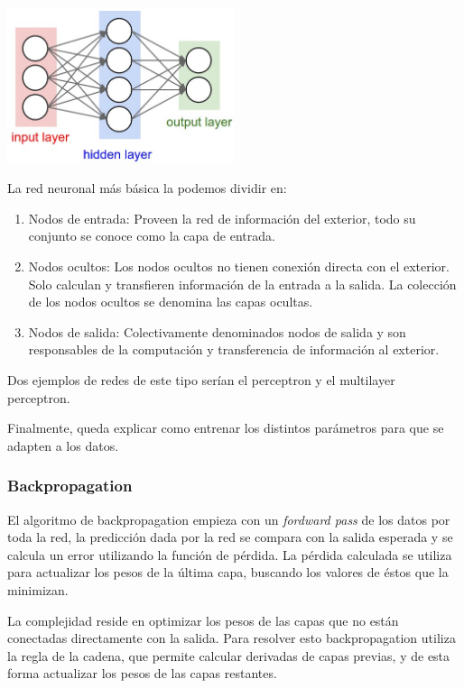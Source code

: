 \documentclass[12,twoside]{TFG-GM}
\theoremstyle{definition}
\theoremstyle{remark}
\begin{document}
\begin{center}
\includegraphics[width=0.5\textwidth]{Images/neural_net.jpeg} 
\end{center}
La red neuronal más básica la podemos dividir en: 
\begin{enumerate}
\item Nodos de entrada: Proveen la red de información del exterior, todo su conjunto se conoce como la capa de entrada. 
\item Nodos ocultos: Los nodos ocultos no tienen conexión directa con el exterior. Solo calculan y transfieren información de la entrada a la salida. La colección de los nodos ocultos se denomina las capas ocultas.
\item Nodos de salida: Colectivamente denominados nodos de salida y son responsables de la computación y transferencia de información al exterior. 
\end{enumerate}

Dos ejemplos de redes de este tipo serían el perceptron y el multilayer perceptron. 

Finalmente, queda explicar como entrenar los distintos parámetros para que se adapten a los datos. 

\subsubsection{Backpropagation}

El algoritmo de backpropagation empieza con un \textit{fordward pass} de los datos por toda la red, la predicción dada por la red se compara con la salida esperada 
y se calcula un error utilizando la función de pérdida. La pérdida calculada se utiliza para actualizar los pesos de la última capa, buscando los valores de éstos que la minimizan.

La complejidad reside en optimizar los pesos de las capas que no están conectadas directamente con la salida. Para resolver esto backpropagation utiliza la regla de la cadena, que permite calcular derivadas de capas previas, y de esta forma actualizar los pesos de las capas restantes. 
\end{document}
